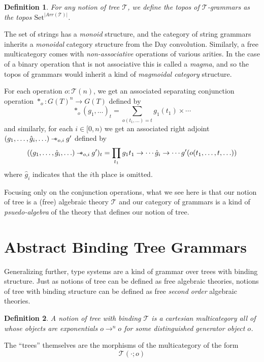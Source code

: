 \documentclass[12pt]{article}
\newcommand{\Set}{\textrm{Set}}
\newtheorem{definition}{Definition}
\newcommand\rsepimp{\mathbin{-\mkern-6mu*}}
\newcommand\sepconj{\mathbin{*}}
\begin{document}
\begin{definition}
  For any notion of tree $\mathcal T$, we define the topos of
  $\mathcal T$-grammars as the topos $\Set^{|Arr(\mathcal T)|}$.
\end{definition}

The set of strings has a \emph{monoid} structure, and the category of
string grammars inherits a \emph{monoidal} category structure from the
Day convolution.
%
Similarly, a free multicategory comes with \emph{non-associative}
operations of various arities. In the case of a binary operation that
is not associative this is called a \emph{magma}, and so the topos of
grammars would inherit a kind of \emph{magmoidal category} structure.

For each operation $o : \mathcal T(n)$, we get an associated
separating conjunction operation $\sepconj_o : G(T)^n \to G(T)$ defined by
\[ \sepconj_o(g_1,\ldots)_t = \sum_{o(t_1,\ldots) = t} g_1(t_1) \times \cdots\]
and similarly, for each $i \in [0,n)$ we get an associated right
adjoint $(g_1,\ldots,\hat g_i,\ldots)\rsepimp_{o,i} g'$ defined by
\[ ((g_1,\ldots,\hat g_i,\ldots)\rsepimp_{o,i} g')_t = \prod_{t_1} g_1 t_1 \to \cdots \hat g_i \to \cdots g'(o(t_1,\ldots,t,\ldots))\]
where $\hat g_i$ indicates that the $i$th place is omitted.

Focusing only on the conjunction operations, what we see here is that
our notion of tree is a (free) algebraic theory $\mathcal T$ and our
category of grammars is a kind of \emph{psuedo-algebra} of the theory
that defines our notion of tree.

\section{Abstract Binding Tree Grammars}

Generalizing further, type systems are a kind of grammar over trees
with binding structure. Just as notions of tree can be defined as free
algebraic theories, notions of tree with binding structure can be
defined as free \emph{second order} algebraic theories.

\begin{definition}
  A notion of tree with binding $\mathcal T$ is a cartesian
  multicategory all of whose objects are exponentials $o \to^n o$ for
  some distinguished generator object $o$.
\end{definition}

The ``trees'' themselves are the morphisms of the multicategory of the
form
\[ \mathcal T(\cdot; o) \]
\end{document}
